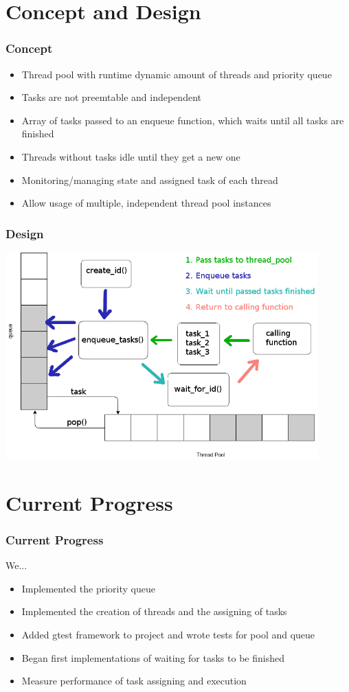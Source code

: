 \documentclass{beamer}
\begin{document}
\section{Concept and Design}
\begin{frame}
	\frametitle{Concept}
	\begin{itemize}
		\item Thread pool with runtime dynamic amount of threads and priority queue
		\item Tasks are not preemtable and independent
		\item Array of tasks passed to an enqueue function, which waits until all tasks are finished
		\item Threads without tasks idle until they get a new one
		\item Monitoring/managing state and assigned task of each thread
		\item Allow usage of multiple, independent thread pool instances 
	\end{itemize}
\end{frame}

\begin{frame}
\frametitle{Design}
	\begin{center}
		\includegraphics[width=0.9\textwidth]{img/pool_queue.png}
	\end{center}
\end{frame}

\section{Current Progress}
\begin{frame}
	\frametitle{Current Progress}
	We...
	\begin{itemize}
		\item Implemented the priority queue 
		\item Implemented the creation of threads and the assigning of tasks
		\item Added gtest framework to project and wrote tests for pool and queue
		\item Began first implementations of waiting for tasks to be finished
		\item Measure performance of task assigning and execution
	\end{itemize}
\end{frame}
\end{document}
